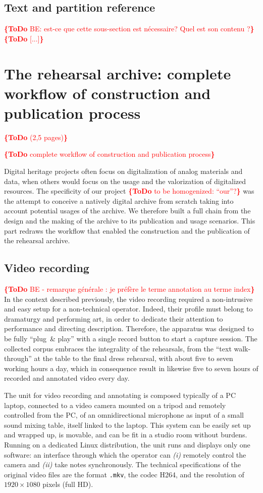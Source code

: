 \documentclass[conference]{IEEEtran}
\newcommand{\todo}[1]{\noindent\textcolor{red}{{\bf \{ToDo} #1{\bf \}}}}
\begin{document}
\subsection{Text and partition reference}
\todo{BE: est-ce que cette sous-section est nécessaire? Quel est son contenu ?}
\todo{[...]}


\section{The rehearsal archive: complete workflow of construction and publication process}
\todo{(2,5 pages)}

\todo{complete workflow of construction and publication process}

Digital heritage projects often focus on digitalization of analog materials and data,
when others would focus on the usage and the valorization of digitalized resources.
The specificity of our project \todo{to be homogenized: ``our''?}
was the attempt to conceive a natively digital archive from scratch
taking into account potential usages of the archive.
We therefore built a full chain from the design and the making of the archive
to its publication and usage scenarios.
This part redraws the workflow that enabled the construction and the publication of the rehearsal archive.

\subsection{Video recording}
\todo{BE - remarque générale : je préfère le terme annotation au terme index}
In the context described previously, the video recording required a non-intrusive and easy setup for a non-technical operator. Indeed, their profile must belong to dramaturgy and performing art, in order to dedicate their attention to performance and directing description. Therefore, the apparatus was designed to be fully ``plug\ \& play'' with a single record button to start a capture session.
The collected corpus embraces the integrality of the rehearsals, from the ``text walk-through'' at the table to the final dress rehearsal, with about five to seven working hours a day, which in consequence result in likewise five to seven hours of recorded and annotated video every day.

The unit for video recording and annotating is composed typically of a PC laptop, connected to a video camera mounted on a tripod and remotely controlled from the PC, of an omnidirectional microphone as input of a small sound mixing table, itself linked to the laptop. This system can be easily set up and wrapped up, is movable, and can be fit in a studio room without burdens. Running on a dedicated Linux distribution, the unit runs and displays only one software: an interface through which the operator can \emph{(i)} remotely control the camera and \emph{(ii)} take notes synchronously. 
The technical specifications of the original video files are the format \texttt{.mkv}, the codec H264, and the resolution of $1920 \times 1080$ pixels (full HD).
\end{document}
